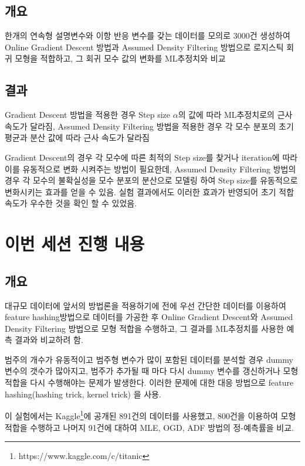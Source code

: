 \documentclass[oneside,b5paper,11pt]{article} %
\begin{document}
\subsection{개요}
 한개의 연속형 설명변수와 이항 반응 변수를 갖는 데이터를 모의로 3000건 생성하여 Online Gradient Descent 방법과 Assumed Density Filtering 방법으로 로지스틱 회귀 모형을 적합하고, 그 회귀 모수 값의 변화를 ML추정치와 비교
\subsection{결과}
 Gradient Descent 방법을 적용한 경우 Step size $\alpha$의 값에 따라 ML추정치로의 근사 속도가 달라짐, Assumed Density Filtering 방법을 적용한 경우 각 모수 분포의 초기 평균과 분산 값에 따라 근사 속도가 달라짐

 Gradient Descent의 경우 각 모수에 따른 최적의 Step size를 찾거나 iteration에 따라 이를 유동적으로 변화 시켜주는 방법이 필요한데, Assumed Density Filtering 방법의 경우 각 모수의 불확실성을 모수 분포의 분산으로 모델링 하여 Step size를 유동적으로 변화시키는 효과를 얻을 수 있음.
실험 결과에서도 이러한 효과가 반영되어 초기 적합 속도가 우수한 것을 확인 할 수 있었음.



\section{이번 세션 진행 내용}
\subsection{개요}
 대규모 데이터에 앞서의 방법론을 적용하기에 전에 우선 간단한 데이터를 이용하여 feature hashing방법으로 데이터를 가공한 후  Online Gradient Descent와 Assumed Density Filtering 방법으로 모형 적합을 수행하고, 그 결과를 ML추정치를 사용한 예측 결과와 비교하려 함.

 범주의 개수가 유동적이고 범주형 변수가 많이 포함된 데이터를 분석할 경우 dummy 변수의 갯수가 많아지고, 범주가 추가될 때 마다 다시 dummy 변수를 갱신하거나 모형 적합을 다시 수행해야는 문제가 발생한다. 이러한 문제에 대한 대응 방법으로 feature hashing(hashing trick, kernel trick) 을 사용.

 이 실험에서는 Kaggle\footnote{https://www.kaggle.com/c/titanic}에 공개된 891건의 데이터를 사용했고, 800건을 이용하여 모형 적합을 수행하고 나머지 91건에 대하여 MLE, OGD, ADF 방법의 정-예측률을 비교.
\end{document}
